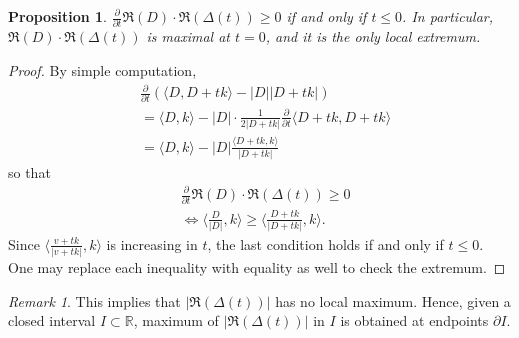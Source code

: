 \documentclass{article}
\theoremstyle{definition}
\theoremstyle{plain}
\newtheorem{proposition}{Proposition}
\theoremstyle{remark}
\newtheorem*{remark}{Remark}
\numberwithin{equation}{section}
\newcommand{\bR}{\mathbb{R}}
\newcommand{\abs}[1]{\left| {#1} \right|}
\newcommand{\inprod}[2]{\langle {#1}, {#2} \rangle}
\begin{document}
\begin{proposition}
  $\frac{\partial}{\partial t} \Re(D) \cdot \Re(\Delta(t)) \geq 0$ if and only if $t \leq 0$.
  In particular, $\Re(D) \cdot \Re(\Delta(t))$ is maximal at $t = 0$,
  and it is the only local extremum.
\end{proposition}
\begin{proof}
  By simple computation,
  \begin{align*}
    & \frac{\partial}{\partial t} \left( \inprod{D}{D + tk} - \abs{D} \abs{D+tk} \right) \\
    & = \inprod{D}{k} - \abs{D} \cdot \frac{1}{2 \abs{D + tk}} \frac{\partial}{\partial t} \inprod{D + tk}{D + tk} \\
    & = \inprod{D}{k} - \abs{D} \frac{\inprod{D+tk}{k}}{\abs{D + tk}}
  \end{align*}
  so that
  \begin{align*}
    & \frac{\partial}{\partial t} \Re(D) \cdot \Re(\Delta(t)) \geq 0 \\
    & \Leftrightarrow \inprod{\frac{D}{\abs{D}}}{k} \geq \inprod{\frac{D + tk}{\abs{D + tk}}}{k}.
  \end{align*}
  Since $\inprod{\frac{v+tk}{\abs{v+tk}}}{k}$ is increasing in $t$,
  the last condition holds if and only if $t \leq 0$.
  One may replace each inequality with equality as well to check the extremum.
\end{proof}

\begin{remark}
  This implies that $\abs{\Re(\Delta(t))}$ has no local maximum.
  Hence, given a closed interval $I \subset \bR$,
  maximum of $\abs{\Re(\Delta(t))}$ in $I$ is obtained at endpoints $\partial I$.
\end{remark}
\end{document}
